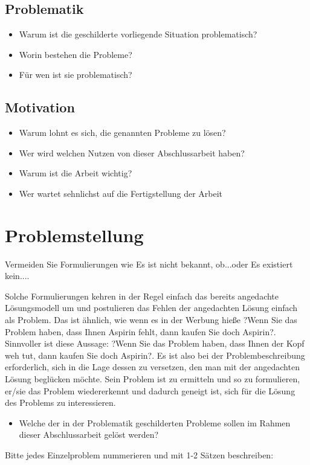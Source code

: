 \subsection{Problematik}
\begin{itemize}
\item Warum ist die geschilderte vorliegende Situation problematisch?
\item Worin bestehen die Probleme?
\item Für wen ist sie problematisch?
\end{itemize}

\subsection{Motivation}

\begin{itemize}
\item Warum lohnt es sich, die genannten Probleme zu lösen?
\item Wer wird welchen Nutzen von dieser Abschlussarbeit haben?
\item Warum ist die Arbeit wichtig?
\item Wer wartet sehnlichst auf die Fertigstellung der Arbeit

\end{itemize}

\section{Problemstellung}

Vermeiden Sie Formulierungen wie \glqq Es ist nicht bekannt, ob...\grqq oder \glqq Es existiert kein...\grqq.

Solche Formulierungen kehren in der Regel einfach das bereits angedachte Lösungsmodell um und postulieren das Fehlen der angedachten Lösung einfach als Problem. Das ist ähnlich, wie wenn es  in der Werbung hieße ?Wenn Sie das Problem haben, dass Ihnen Aspirin fehlt, dann kaufen Sie doch Aspirin?. Sinnvoller ist diese Aussage:  ?Wenn Sie das Problem haben, dass Ihnen der Kopf weh tut, dann kaufen Sie doch Aspirin?. Es ist also bei der Problembeschreibung erforderlich, sich in die Lage dessen zu versetzen, den man mit der angedachten Lösung beglücken möchte. Sein Problem ist zu ermitteln und so zu formulieren, er/sie das Problem wiedererkennt und dadurch geneigt ist, sich für die Lösung des Problems zu interessieren.

\begin{itemize}
\item Welche der in der Problematik geschilderten Probleme sollen im Rahmen dieser Abschlussarbeit gelöst werden?
\end{itemize}
Bitte jedes Einzelproblem nummerieren und mit 1-2 Sätzen beschreiben:

